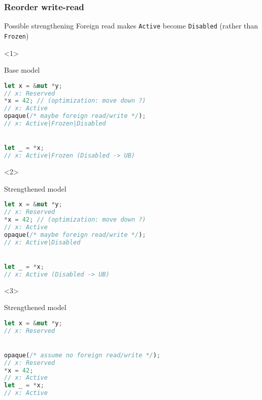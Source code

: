 \begin{frame}[fragile, t]
    \frametitle{Reorder write-read}
    \begin{exampleblock}{Possible strengthening}
        Foreign read makes \texttt{Active} become \texttt{Disabled}
        (rather than \texttt{Frozen})
    \end{exampleblock}


    \begin{onlyenv}<1>
        \begin{block}{{\xmark} Base model}
            \begin{lstlisting}[language=rust, basicstyle=\ttfamily\scriptsize]
let x = &mut *y;
// x: Reserved
*x = 42; // (optimization: move down ?)
// x: Active
opaque(/* maybe foreign read/write */);
// x: Active|Frozen|Disabled


let _ = *x;
// x: Active|Frozen (Disabled -> UB)
            \end{lstlisting}
        \end{block}
    \end{onlyenv}

    \begin{onlyenv}<2>
        \begin{block}{{\cmark} Strengthened model}
            \begin{lstlisting}[language=rust, basicstyle=\ttfamily\scriptsize]
let x = &mut *y;
// x: Reserved
*x = 42; // (optimization: move down ?)
// x: Active
opaque(/* maybe foreign read/write */);
// x: Active|Disabled


let _ = *x;
// x: Active (Disabled -> UB)
            \end{lstlisting}
        \end{block}
    \end{onlyenv}

    \begin{onlyenv}<3>
        \begin{block}{{\cmark} Strengthened model}
            \begin{lstlisting}[language=rust, basicstyle=\ttfamily\scriptsize]
let x = &mut *y;
// x: Reserved


opaque(/* assume no foreign read/write */);
// x: Reserved
*x = 42;
// x: Active
let _ = *x;
// x: Active
            \end{lstlisting}
        \end{block}
    \end{onlyenv}


\end{frame}
